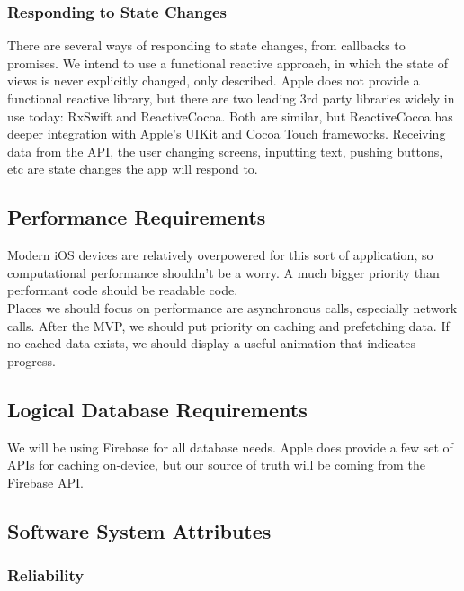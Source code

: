 \documentclass[letterpaper,10pt,titlepage]{article}
\begin{document}
\subsubsection{Responding to State Changes}

There are several ways of responding to state changes, from callbacks to promises. We intend to use a functional reactive approach, in which the state of views is never explicitly changed, only described. Apple does not provide a functional reactive library, but there are two leading 3rd party libraries widely in use today: RxSwift and ReactiveCocoa. Both are similar, but ReactiveCocoa has deeper integration with Apple’s UIKit and Cocoa Touch frameworks.
Receiving data from the API, the user changing screens, inputting text, pushing buttons, etc are state changes the app will respond to.\\

\subsection{Performance Requirements}

Modern iOS devices are relatively overpowered for this sort of application, so computational performance shouldn’t be a worry. A much bigger priority than performant code should be readable code.\\

Places we should focus on performance are asynchronous calls, especially network calls. After the MVP, we should put priority on caching and prefetching data. If no cached data exists, we should display a useful animation that indicates progress.

\subsection{Logical Database Requirements}

We will be using Firebase for all database needs. Apple does provide a few set of APIs for caching on-device, but our source of truth will be coming from the Firebase API.\\

\subsection{Software System Attributes}

\subsubsection{Reliability}
\end{document}
